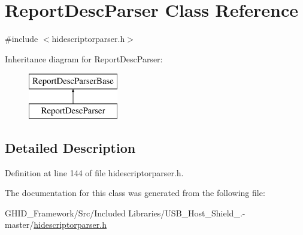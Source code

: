 \hypertarget{class_report_desc_parser}{\section{\-Report\-Desc\-Parser \-Class \-Reference}
\label{class_report_desc_parser}
}


{\ttfamily \#include $<$hidescriptorparser.\-h$>$}

\-Inheritance diagram for \-Report\-Desc\-Parser\-:\begin{figure}[H]
\begin{center}
\leavevmode
\includegraphics[height=2.000000cm]{class_report_desc_parser}
\end{center}
\end{figure}


\subsection{\-Detailed \-Description}


\-Definition at line 144 of file hidescriptorparser.\-h.



\-The documentation for this class was generated from the following file\-:\begin{DoxyCompactItemize}
\item 
\-G\-H\-I\-D\-\_\-\-Framework/\-Src/\-Included Libraries/\-U\-S\-B\-\_\-\-Host\-\_\-\-Shield\-\_.-\/master/\hyperlink{hidescriptorparser_8h}{hidescriptorparser.\-h}\end{DoxyCompactItemize}
